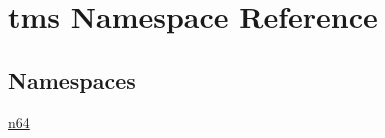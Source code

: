\hypertarget{namespacetms}{}\section{tms Namespace Reference}
\label{namespacetms}
\subsection*{Namespaces}
\begin{DoxyCompactItemize}
\item 
 \hyperlink{namespacetms_1_1n64}{n64}
\end{DoxyCompactItemize}
